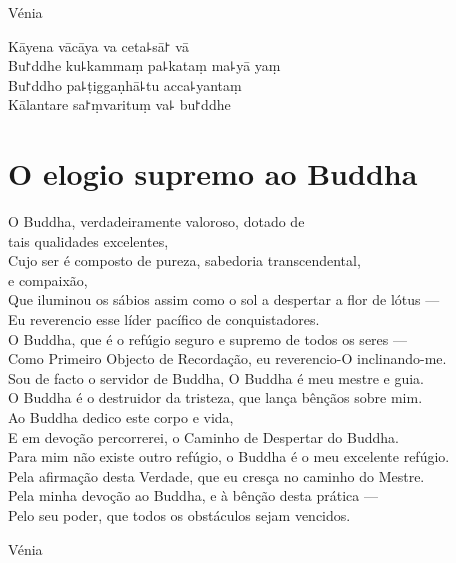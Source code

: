 \begin{instruction}
  Vénia
\end{instruction}

Kāyena vācāya va ceta꜕sā꜓ vā\\
Bu꜓ddhe ku꜕kammaṃ pa꜕kataṃ ma꜕yā yaṃ\\
Bu꜓ddho pa꜕ṭiggaṇhā꜕tu acca꜕yantaṃ\\
Kālantare sa꜓ṃvarituṃ va꜕ bu꜓ddhe

\clearpage

\chapter{O elogio supremo ao Buddha}

\begin{leader}
\end{leader}

O Buddha, verdadeiramente valoroso, dotado de\\
\vin tais qualidades  excelentes,\\
Cujo ser é composto de pureza, sabedoria transcendental,\\
\vin e compaixão,\\
Que iluminou os sábios assim como o sol a despertar a flor de lótus ---\\
Eu reverencio esse líder pacífico de conquistadores.\\
O Buddha, que é o refúgio seguro e supremo de todos os seres ---\\
Como Primeiro Objecto de Recordação, eu reverencio-O inclinando-me.\\
Sou de facto o servidor de Buddha, O Buddha é meu mestre e guia.\\
O Buddha é o destruidor da tristeza, que lança bênçãos sobre mim.\\
Ao Buddha dedico este corpo e vida,\\
E em devoção percorrerei, o Caminho de Despertar do Buddha.\\
Para mim não existe outro refúgio, o Buddha é o meu excelente refúgio.\\
Pela afirmação desta Verdade, que eu cresça no caminho do Mestre.\\
Pela minha devoção ao Buddha, e à bênção desta prática ---\\
Pelo seu poder, que todos os obstáculos sejam vencidos.

\begin{instruction}
  Vénia
\end{instruction}

